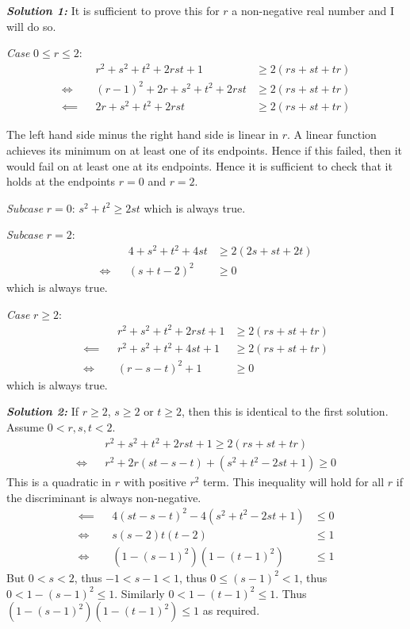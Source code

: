 \documentclass[12pt]{article}
\newcommand{\solnum}[1]{\textbf{\textit{Solution #1: }}}
\begin{document}
\begin{enumerate}[topsep=\bigskipamount,itemsep=\bigskipamount,leftmargin=0pt]
\solnum{1}
It is sufficient to prove this for $r$ a non-negative real number and I will do so.

\textit{Case} $0 \leqslant r \leqslant 2$:
\begin{align*}
    && r^{2} + s^{2} + t^{2} + 2rst + 1 & \geqslant 2(rs + st + tr)\\
    \iff &&  (r-1)^2+ 2r + s^2 + t^2 + 2rst & \geqslant 2(rs + st + tr)\\
    \impliedby && 2r + s^2 + t^2 + 2rst & \geqslant 2(rs + st + tr)
\end{align*}

The left hand side minus the right hand side
is linear in $r$.
A linear function achieves its minimum on
at least one of its endpoints.
Hence if this failed,
then it would fail on at least one at its endpoints.
Hence it is sufficient to check
that it holds at the endpoints $r=0$ and $r=2$.

\textit{Subcase} $r=0$: $s^2 + t^2\geqslant 2st$ which is always true.

\textit{Subcase} $r=2$:
\begin{align*}
    && 4 + s^2 + t^2 + 4st & \geqslant 2(2s + st + 2t)\\
    \iff && (s+t-2)^2 & \geqslant 0
\end{align*}
which is always true.

\textit{Case} $r \geqslant 2$:
\begin{align*}
    && r^{2} + s^{2} + t^{2} + 2rst + 1 & \geqslant 2(rs + st + tr)\\
    \impliedby && r^{2} + s^{2} + t^{2} + 4st + 1 & \geqslant 2(rs + st + tr)\\
    \iff && (r-s-t)^2 + 1 & \geqslant 0
\end{align*}
which is always true.

\solnum{2}
If $r \geqslant 2$, $s \geqslant 2$ or $t \geqslant 2$,
then this is identical to the first solution.
Assume $0 < r,s,t < 2$.
\begin{align*}
    && r^{2} + s^{2} + t^{2} + 2rst + 1 \geqslant 2(rs + st + tr)\\
    \iff && r^{2} + 2r(st-s-t) + (s^{2} + t^{2} -2st + 1) \geqslant 0
\end{align*}
This is a quadratic in $r$
with positive $r^2$ term.
This inequality will hold for all $r$
if the discriminant is always non-negative.
\begin{align*}
    \impliedby && 4(st-s-t)^2 - 4(s^{2} + t^{2} -2st + 1)  & \leqslant 0\\
    \iff && s(s-2)t(t-2) & \leqslant 1\\
    \iff && (1-(s-1)^2)(1-(t-1)^2)  & \leqslant 1
\end{align*}
But $0 < s < 2$,
thus $-1 < s-1 < 1$,
thus $0\leqslant (s-1)^2 < 1$,
thus $0 < 1-(s-1)^2 \leqslant 1$.
Similarly $0 < 1-(t-1)^2 \leqslant 1$.
Thus $(1-(s-1)^2)(1-(t-1)^2)  \leqslant 1$
as required.


\end{enumerate}
\end{document}
